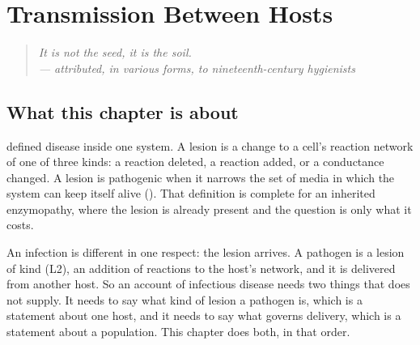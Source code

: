 ﻿%

\chapter{Transmission Between Hosts}
\label{ch:social-mechanics}
\label{sm:ch:social-mechanics}

\begin{quote}
\itshape
It is not the seed, it is the soil.
\upshape\medskip\\
\hfill --- attributed, in various forms, to nineteenth-century hygienists
\end{quote}

\section{What this chapter is about}
\label{sm:sec:intro}

 defined disease inside one system. A lesion is a
change to a cell's reaction network of one of three kinds: a reaction
deleted, a reaction added, or a conductance changed. A lesion is
pathogenic when it narrows the set of media in which the system can keep
itself alive (). That definition is complete for an
inherited enzymopathy, where the lesion is already present and the question
is only what it costs.

An infection is different in one respect: the lesion arrives. A pathogen is
a lesion of kind (L2), an addition of reactions to the host's network, and
it is delivered from another host. So an account of infectious disease needs
two things that  does not supply. It needs to say
what kind of lesion a pathogen is, which is a statement about one host, and
it needs to say what governs delivery, which is a statement about a
population. This chapter does both, in that order.

